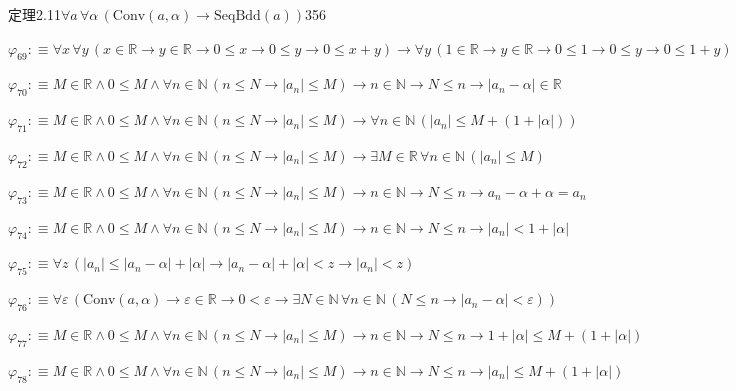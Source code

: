 \begin{fullproof}{定理2.11}{$\forall a\,\forall \alpha\,(\mathrm{Conv}(a,\alpha) \to \mathrm{SeqBdd}(a))$}{356}
\begin{abbrevlist}
\item $\varphi_{69} :\equiv \forall x\,\forall y\,(x \in \mathbb{R} \to y \in \mathbb{R} \to 0 \leq x \to 0 \leq y \to 0 \leq x + y) \to \forall y\,(1 \in \mathbb{R} \to y \in \mathbb{R} \to 0 \leq 1 \to 0 \leq y \to 0 \leq 1 + y)$
\item $\varphi_{70} :\equiv M \in \mathbb{R} \land 0 \leq M \land \forall n \in \mathbb{N}\,(n \leq N \to \lvert a_{n} \rvert \leq M) \to n \in \mathbb{N} \to N \leq n \to \lvert a_{n} - \alpha \rvert \in \mathbb{R}$
\item $\varphi_{71} :\equiv M \in \mathbb{R} \land 0 \leq M \land \forall n \in \mathbb{N}\,(n \leq N \to \lvert a_{n} \rvert \leq M) \to \forall n \in \mathbb{N}\,(\lvert a_{n} \rvert \leq M + (1 + \lvert \alpha \rvert))$
\item $\varphi_{72} :\equiv M \in \mathbb{R} \land 0 \leq M \land \forall n \in \mathbb{N}\,(n \leq N \to \lvert a_{n} \rvert \leq M) \to \exists M \in \mathbb{R}\,\forall n \in \mathbb{N}\,(\lvert a_{n} \rvert \leq M)$
\item $\varphi_{73} :\equiv M \in \mathbb{R} \land 0 \leq M \land \forall n \in \mathbb{N}\,(n \leq N \to \lvert a_{n} \rvert \leq M) \to n \in \mathbb{N} \to N \leq n \to a_{n} - \alpha + \alpha = a_{n}$
\item $\varphi_{74} :\equiv M \in \mathbb{R} \land 0 \leq M \land \forall n \in \mathbb{N}\,(n \leq N \to \lvert a_{n} \rvert \leq M) \to n \in \mathbb{N} \to N \leq n \to \lvert a_{n} \rvert < 1 + \lvert \alpha \rvert$
\item $\varphi_{75} :\equiv \forall z\,(\lvert a_{n} \rvert \leq \lvert a_{n} - \alpha \rvert + \lvert \alpha \rvert \to \lvert a_{n} - \alpha \rvert + \lvert \alpha \rvert < z \to \lvert a_{n} \rvert < z)$
\item $\varphi_{76} :\equiv \forall \varepsilon\,(\mathrm{Conv}(a,\alpha) \to \varepsilon \in \mathbb{R} \to 0 < \varepsilon \to \exists N \in \mathbb{N}\,\forall n \in \mathbb{N}\,(N \leq n \to \lvert a_{n} - \alpha \rvert < \varepsilon))$
\item $\varphi_{77} :\equiv M \in \mathbb{R} \land 0 \leq M \land \forall n \in \mathbb{N}\,(n \leq N \to \lvert a_{n} \rvert \leq M) \to n \in \mathbb{N} \to N \leq n \to 1 + \lvert \alpha \rvert \leq M + (1 + \lvert \alpha \rvert)$
\item $\varphi_{78} :\equiv M \in \mathbb{R} \land 0 \leq M \land \forall n \in \mathbb{N}\,(n \leq N \to \lvert a_{n} \rvert \leq M) \to n \in \mathbb{N} \to N \leq n \to \lvert a_{n} \rvert \leq M + (1 + \lvert \alpha \rvert)$

\end{abbrevlist}
\end{fullproof}
